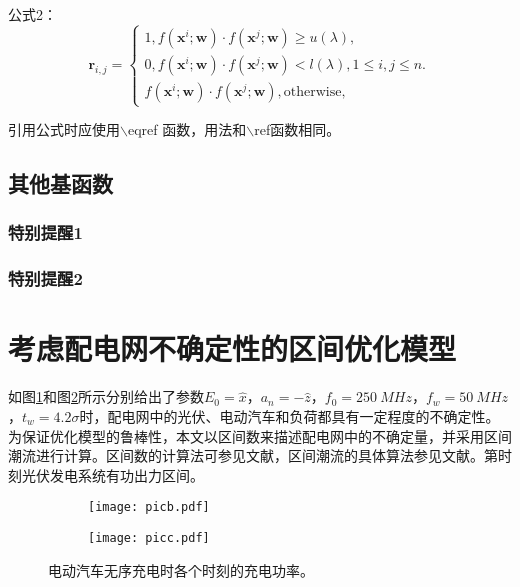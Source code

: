 \documentclass[bachelor]{NCEPU-thesis}
\begin{document}
公式2：
\begin{equation}
\label{latent_binary_variable}
\bm{r}_{i,j}=
\begin{cases}
1,f(\bm{x}^{i};\bm{w})\cdot f(\bm{x}^{j};\bm{w})\geq u(\lambda),\\
0,f(\bm{x}^{i};\bm{w})\cdot f(\bm{x}^{j};\bm{w})< l(\lambda), 1\leq i,j\leq n.\\
f(\bm{x}^{i};\bm{w})\cdot f(\bm{x}^{j};\bm{w}),\text{otherwise},
\end{cases}
\end{equation}

引用公式时应使用$\backslash$eqref 函数，用法和$\backslash$ref函数相同。

\subsection{其他基函数}

\subsubsection{特别提醒1}

\subsubsection{特别提醒2}

\section{考虑配电网不确定性的区间优化模型}

如图\ref{picb}和图\ref{picc}所示分别给出了参数$E_0=\hat{x}$，$a_n=-\hat{z}$，$f_0=\SI{250}{MHz}$，$f_w=\SI{50}{MHz}$，$t_w=4.2\sigma$时，配电网中的光伏、电动汽车和负荷都具有一定程度的不确定性。为保证优化模型的鲁棒性，本文以区间数来描述配电网中的不确定量，并采用区间潮流进行计算。区间数的计算法可参见文献，区间潮流的具体算法参见文献。第时刻光伏发电系统有功出力区间。

\begin{figure}[h]
	\begin{subfigure}[b]{0.49\linewidth}
		\texttt{[image: picb.pdf]}
		\label{picb}
    \end{subfigure}
	\begin{subfigure}[b]{0.49\linewidth}
		\texttt{[image: picc.pdf]}
		\label{picc}
    \end{subfigure}
	\caption{电动汽车无序充电时各个时刻的充电功率。}
	\label{fig1}
\end{figure}
\end{document}
